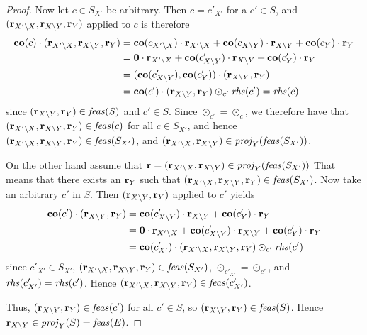 \begin{proof}
Now let $c\in S_{X'}$ be arbitrary. Then $c = c'_{X'}$ for a $c'\in S$, and $(\mathbf{r}_{X'\setminus X}, \mathbf{r}_{X\setminus Y}, \mathbf{r}_Y)$ applied to $c$ is therefore
\begin{align*}
\mathbf{co}(c)\cdot (\mathbf{r}_{X'\setminus X}, \mathbf{r}_{X\setminus Y}, \mathbf{r}_Y)  
&= \mathbf{co}(c_{X'\setminus X})\cdot \mathbf{r}_{X'\setminus X} + \mathbf{co}(c_{X\setminus Y})\cdot \mathbf{r}_{X\setminus Y} + \mathbf{co}(c_Y)\cdot \mathbf{r}_Y\\
&= \mathbf{0}\cdot \mathbf{r}_{X'\setminus X} + \mathbf{co}(c'_{X\setminus Y})\cdot \mathbf{r}_{X\setminus Y} + \mathbf{co}(c'_Y)\cdot \mathbf{r}_Y\\
&= (\mathbf{co}(c'_{X\setminus Y}),\mathbf{co}(c'_Y))\cdot (\mathbf{r}_{X\setminus Y}, \mathbf{r}_Y)\\
&= \mathbf{co}(c')\cdot (\mathbf{r}_{X\setminus Y}, \mathbf{r}_Y)\odot_{c'} \mathit{rhs}(c')=\mathit{rhs}(c)
\end{align*}
since $(\mathbf{r}_{X\setminus Y}, \mathbf{r}_Y)\in \mathit{feas}(S)$ and $c'\in S$. Since $\odot_{c'}=\odot_c$, we therefore have that 
$(\mathbf{r}_{X'\setminus X}, \mathbf{r}_{X\setminus Y}, \mathbf{r}_Y)\in \mathit{feas}(c)$ for all $c\in S_{X'}$, and hence 
$(\mathbf{r}_{X'\setminus X}, \mathbf{r}_{X\setminus Y}, \mathbf{r}_Y)\in \mathit{feas}(S_{X'})$, and 
$(\mathbf{r}_{X'\setminus X}, \mathbf{r}_{X\setminus Y})\in \mathit{proj}_Y(\mathit{feas}(S_{X'}))$. 
 
On the other hand assume that $\mathbf{r}=(\mathbf{r}_{X'\setminus X}, \mathbf{r}_{X\setminus Y})\in \mathit{proj}_Y(\mathit{feas}(S_{X'}))$
That means that there exists an $\mathbf{r}_Y$ such that $(\mathbf{r}_{X'\setminus X}, \mathbf{r}_{X\setminus Y},\mathbf{r}_Y)\in \mathit{feas}(S_{X'})$.
Now take an arbitrary $c'$ in $S$. Then $(\mathbf{r}_{X\setminus Y}, \mathbf{r}_Y)$ applied to $c'$ yields
\begin{align*}
\mathbf{co}(c')\cdot(\mathbf{r}_{X\setminus Y}, \mathbf{r}_Y)
&= \mathbf{co}(c'_{X\setminus Y})\cdot\mathbf{r}_{X\setminus Y} + \mathbf{co}(c'_Y)\cdot \mathbf{r}_Y\\
&= \mathbf{0}\cdot \mathbf{r}_{X'\setminus X} + \mathbf{co}(c'_{X\setminus Y})\cdot\mathbf{r}_{X\setminus Y} + \mathbf{co}(c'_Y)\cdot \mathbf{r}_Y\\
&= \mathbf{co}(c'_{X'})\cdot(\mathbf{r}_{X'\setminus X},\mathbf{r}_{X\setminus Y}, \mathbf{r}_Y)\odot_{c'}\mathit{rhs}(c')
\end{align*}
since $c'_{X'}\in S_{X'}$, $(\mathbf{r}_{X'\setminus X},\mathbf{r}_{X\setminus Y}, \mathbf{r}_Y)\in\mathit{feas}(S_{X'})$, $\odot_{c'_{X'}}=\odot_{c'}$, and $\mathit{rhs}(c'_{X'})=\mathit{rhs}(c')$. Hence $(\mathbf{r}_{X'\setminus X}, \mathbf{r}_{X\setminus Y},\mathbf{r}_Y)\in \mathit{feas}(c'_{X'})$. 

Thus, $(\mathbf{r}_{X\setminus Y}, \mathbf{r}_Y)\in \mathit{feas}(c')$ for all $c'\in S$, so $(\mathbf{r}_{X\setminus Y}, \mathbf{r}_Y)\in \mathit{feas}(S)$. Hence $\mathbf{r}_{X\setminus Y}\in \mathit{proj}_Y(S)=\mathit{feas}(E)$.


\end{proof}
